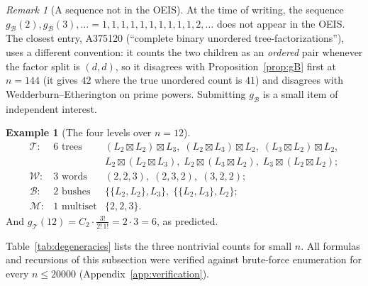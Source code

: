 \documentclass[11pt]{article}
\newcommand{\cT}{\mathcal{T}}   %
\newcommand{\cW}{\mathcal{W}}   %
\newcommand{\cB}{\mathcal{B}}   %
\newcommand{\cM}{\mathcal{M}}   %
\numberwithin{equation}{section}
\theoremstyle{plain}
\theoremstyle{definition}
\newtheorem{example}[theorem]{Example}
\theoremstyle{remark}
\newtheorem{remark}[theorem]{Remark}
\begin{document}
\begin{remark}[A sequence not in the OEIS]\label{rem:newseq}
At the time of writing, the sequence $g_\cB(2), g_\cB(3), \dots =
1,1,1,1,1,1,1,1,1,1,2,\dots$ does not appear in the OEIS. The closest entry, A375120
(``complete binary unordered tree-factorizations''), uses a different convention: it
counts the two children as an \emph{ordered} pair whenever the factor split is
$(d,d)$, so it disagrees with Proposition~\ref{prop:gB} first at $n=144$ (it gives
$42$ where the true unordered count is $41$) and disagrees with
Wedderburn--Etherington on prime powers. Submitting $g_\cB$ is a small item of
independent interest.
\end{remark}

\begin{example}[The four levels over $n = 12$]\label{ex:twelve}
\[
\begin{array}{lll}
\cT: & 6 \text{ trees} &
(L_2\boxtimes L_2)\boxtimes L_3,\;
(L_2\boxtimes L_3)\boxtimes L_2,\;
(L_3\boxtimes L_2)\boxtimes L_2, \\
& & L_2\boxtimes(L_2\boxtimes L_3),\;
L_2\boxtimes(L_3\boxtimes L_2),\;
L_3\boxtimes(L_2\boxtimes L_2); \\[1mm]
\cW: & 3 \text{ words} & (2,2,3),\; (2,3,2),\; (3,2,2); \\[1mm]
\cB: & 2 \text{ bushes} & \{\{L_2,L_2\},L_3\},\; \{\{L_2,L_3\},L_2\}; \\[1mm]
\cM: & 1 \text{ multiset} & \{2,2,3\}.
\end{array}
\]
And $g_\cT(12) = C_2 \cdot \tfrac{3!}{2!\,1!} = 2\cdot 3 = 6$, as predicted.
\end{example}

Table~\ref{tab:degeneracies} lists the three nontrivial counts for small $n$. All
formulas and recursions of this subsection were verified against brute-force enumeration
for every $n \le 20000$ (Appendix~\ref{app:verification}).
\end{document}
